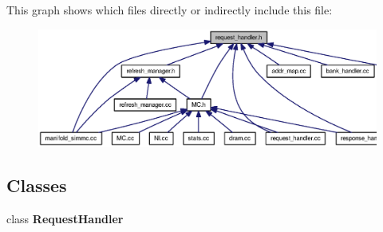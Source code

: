 This graph shows which files directly or indirectly include this file:\nopagebreak
\begin{figure}[H]
\begin{center}
\leavevmode
\includegraphics[width=346pt]{request__handler_8h__dep__incl}
\end{center}
\end{figure}
\subsection*{Classes}
\begin{CompactItemize}
\item 
class {\bf RequestHandler}
\end{CompactItemize}
